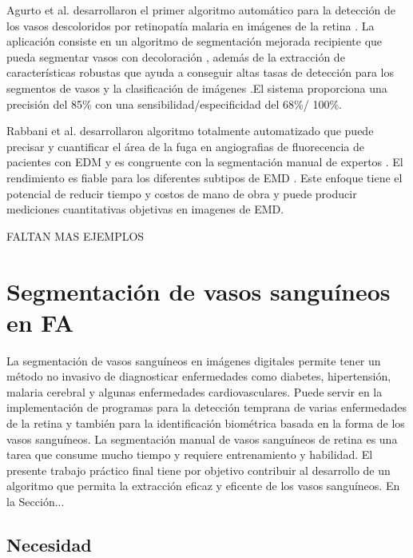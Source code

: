 Agurto et al. \cite{agurto2016vessel}  desarrollaron el primer algoritmo automático para la detección de los vasos descoloridos por retinopatía malaria en imágenes de la retina . La aplicación consiste en un algoritmo de segmentación mejorada recipiente que pueda segmentar vasos con decoloración , además de la extracción de características robustas que  ayuda a conseguir altas tasas de detección para los segmentos de vasos y la clasificación de imágenes .El sistema proporciona una precisión del 85\% con una sensibilidad/especificidad del 68\%/ 100\%. 

Rabbani et al. \cite{rabbani2015fully}  desarrollaron algoritmo totalmente automatizado que puede  precisar y cuantificar el área de la fuga en angiografias de fluorecencia de pacientes con EDM y es congruente con la segmentación manual de expertos . El rendimiento es fiable para los diferentes subtipos de EMD . Este enfoque tiene el potencial de reducir tiempo y costos de mano de obra y puede producir mediciones cuantitativas objetivas en imagenes de EMD.



FALTAN MAS EJEMPLOS

 

\section{Segmentaci\'on de vasos sangu\'ineos en FA}
 
	La segmentación de vasos sanguíneos en imágenes digitales permite tener un método no invasivo de diagnosticar enfermedades como diabetes, hipertensión, malaria cerebral y algunas enfermedades cardiovasculares. Puede servir en la implementación de programas para la detección temprana de varias enfermedades de la retina y también para la identificación biométrica basada en la forma de los vasos sanguíneos. La segmentación manual de vasos sanguíneos de retina es una tarea que consume mucho tiempo y requiere entrenamiento y habilidad. \cite{cepeda2016segmentacion} 
	El presente trabajo pr\'actico final tiene por objetivo contribuir al desarrollo de un algoritmo que permita la extracci\'on eficaz y eficente de los vasos sangu\'ineos. En la Secci\'on...	
	
	\subsection{Necesidad}
	
